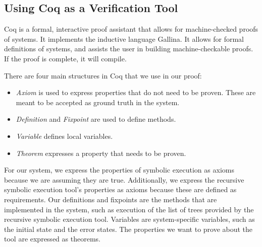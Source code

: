 \subsection{Using Coq as a Verification Tool}
Coq is a formal, interactive proof assistant that allows for machine-checked proofs of systems. 
It implements the inductive language Gallina. It allows for formal definitions of systems, and assists the user in building machine-checkable proofs. If the proof is complete, it will compile.

There are four main structures in Coq that we use in our proof:
\begin{itemize}
\item \emph{Axiom} is used to express properties that do not need to be proven. These are meant to be accepted as ground truth in the system. 
\item \emph{Definition} and \emph{Fixpoint} are used to define methods.
\item \emph{Variable} defines local variables.
\item \emph{Theorem} expresses a property that needs to be proven.

\end{itemize}

For our system, we express the properties of symbolic execution as axioms
because we are assuming they are true. Additionally, we express the recursive
symbolic execution tool's properties as axioms because these are defined as
requirements. Our definitions and fixpoints are the methods that are implemented
in the system, such as execution of the list of trees provided by the recursive
symbolic execution tool. Variables are system-specific variables, such as the
initial state and the error states. The properties we want to prove about the
tool are expressed as theorems.






